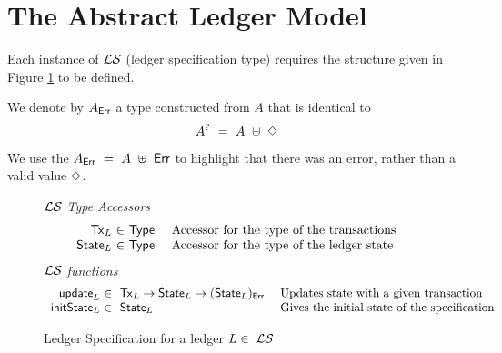 \section{The Abstract Ledger Model}
\label{sec:model}


Each instance of $\mathcal{L}\mathcal{S}$ (ledger specification type) requires the structure
given in Figure \ref{fig:ledger-spec} to be defined.

We denote by $A_{\mathsf{Err}}$ a type constructed from $A$ that is identical to
\[ A^?~=~A~\uplus~\Diamond \]

We use the $A_{\mathsf{Err}}~=~A~\uplus~\mathsf{Err}$ to highlight that
there was an error, rather than a valid value $\Diamond$.

\begin{figure*}[htb]
  \emph{$\mathcal{L}\mathcal{S}$ Type Accessors}
  \begin{equation*}
    \begin{array}{r@{~\in~}l@{~~~~}lr}
      \type{Tx}_L
      & \Type
      & \text{Accessor for the type of the transactions} \\
      \type{State}_L
      & \Type
      & \text{Accessor for the type of the ledger state} \\
    \end{array}
  \end{equation*}
  \emph{$\mathcal{L}\mathcal{S}$ functions}
  \begin{equation*}
    \begin{array}{r@{~\in~}l@{~~~~}lr}
    \ups_L & ~\type{Tx}_L \to \type{State}_L \to (\type{State}_L)_{\Err}
    & \text{Updates state with a given transaction} \\
    \fun{initState}_L & ~\type{State}_L
    & \text{Gives the initial state of the specification} \\
    \end{array}
  \end{equation*}
  \caption{Ledger Specification for a ledger $L\in~\mathcal{L}\mathcal{S}$}
  \label{fig:ledger-spec}
\end{figure*}

